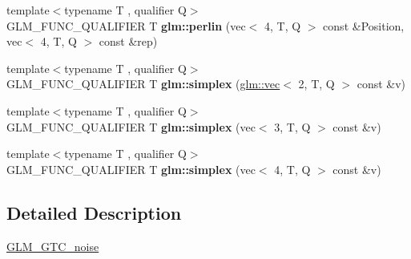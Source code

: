 \begin{DoxyCompactItemize}
\item 
\mbox{\label{noise_8inl_a28583ae399b336a17defb061fba44ce5}} 
{\footnotesize template$<$typename T , qualifier Q$>$ }\\G\+L\+M\+\_\+\+F\+U\+N\+C\+\_\+\+Q\+U\+A\+L\+I\+F\+I\+ER T {\bfseries glm\+::perlin} (vec$<$ 4, T, Q $>$ const \&Position, vec$<$ 4, T, Q $>$ const \&rep)
\item 
\mbox{\label{noise_8inl_a09cb6ae89b52ee4c47e7b708b84e4d13}} 
{\footnotesize template$<$typename T , qualifier Q$>$ }\\G\+L\+M\+\_\+\+F\+U\+N\+C\+\_\+\+Q\+U\+A\+L\+I\+F\+I\+ER T {\bfseries glm\+::simplex} (\hyperlink{structglm_1_1vec}{glm\+::vec}$<$ 2, T, Q $>$ const \&v)
\item 
\mbox{\label{noise_8inl_a9647df123e68432133be68c141dbee4a}} 
{\footnotesize template$<$typename T , qualifier Q$>$ }\\G\+L\+M\+\_\+\+F\+U\+N\+C\+\_\+\+Q\+U\+A\+L\+I\+F\+I\+ER T {\bfseries glm\+::simplex} (vec$<$ 3, T, Q $>$ const \&v)
\item 
\mbox{\label{noise_8inl_ab64811bdfcbf5cbd222e3cb50119816a}} 
{\footnotesize template$<$typename T , qualifier Q$>$ }\\G\+L\+M\+\_\+\+F\+U\+N\+C\+\_\+\+Q\+U\+A\+L\+I\+F\+I\+ER T {\bfseries glm\+::simplex} (vec$<$ 4, T, Q $>$ const \&v)
\end{DoxyCompactItemize}


\subsection{Detailed Description}
\hyperlink{group__gtc__noise}{G\+L\+M\+\_\+\+G\+T\+C\+\_\+noise} 